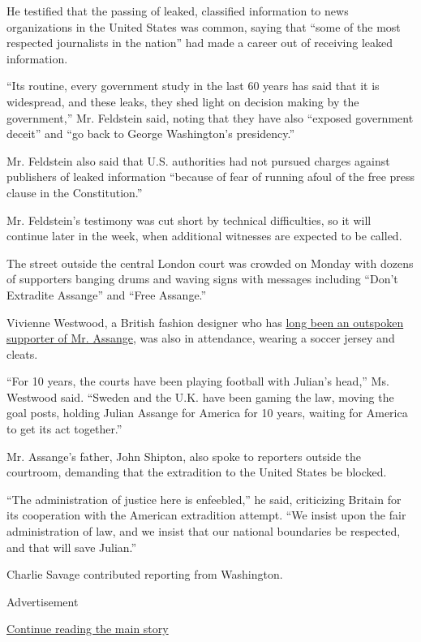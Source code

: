 He testified that the passing of leaked, classified information to news
organizations in the United States was common, saying that ``some of the
most respected journalists in the nation'' had made a career out of
receiving leaked information.

``Its routine, every government study in the last 60 years has said that
it is widespread, and these leaks, they shed light on decision making by
the government,'' Mr. Feldstein said, noting that they have also
``exposed government deceit'' and ``go back to George Washington's
presidency.''

Mr. Feldstein also said that U.S. authorities had not pursued charges
against publishers of leaked information ``because of fear of running
afoul of the free press clause in the Constitution.''

Mr. Feldstein's testimony was cut short by technical difficulties, so it
will continue later in the week, when additional witnesses are expected
to be called.

The street outside the central London court was crowded on Monday with
dozens of supporters banging drums and waving signs with messages
including ``Don't Extradite Assange'' and ``Free Assange.''

Vivienne Westwood, a British fashion designer who has
\href{https://www.nytimes3xbfgragh.onion/2020/07/21/style/vivienne-westwood-julian-assange.html}{long
been an outspoken supporter of Mr. Assange}, was also in attendance,
wearing a soccer jersey and cleats.

``For 10 years, the courts have been playing football with Julian's
head,'' Ms. Westwood said. ``Sweden and the U.K. have been gaming the
law, moving the goal posts, holding Julian Assange for America for 10
years, waiting for America to get its act together.''

Mr. Assange's father, John Shipton, also spoke to reporters outside the
courtroom, demanding that the extradition to the United States be
blocked.

``The administration of justice here is enfeebled,'' he said,
criticizing Britain for its cooperation with the American extradition
attempt. ``We insist upon the fair administration of law, and we insist
that our national boundaries be respected, and that will save Julian.''

Charlie Savage contributed reporting from Washington.

Advertisement

\protect\hyperlink{after-bottom}{Continue reading the main story}

